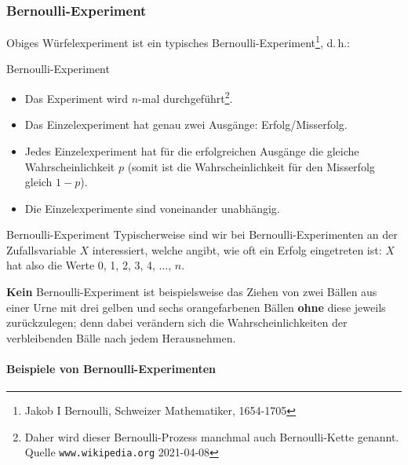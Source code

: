 \subsubsection{Bernoulli-Experiment}
Obiges Würfelexperiment ist ein typisches
Bernoulli-Experiment\footnote{Jakob I Bernoulli, Schweizer Mathematiker,
  1654-1705}, d.\,h.:

\begin{definition}{Bernoulli-Experiment}{}
\begin{itemize}
\item Das Experiment wird $n$-mal durchgeführt\footnote{Daher wird dieser
Bernoulli-Prozess manchmal auch Bernoulli-Kette genannt. Quelle
\texttt{www.wikipedia.org} 2021-04-08}.
\item Das Einzelexperiment hat genau zwei Ausgänge: Erfolg/Misserfolg.
\item Jedes Einzelexperiment hat für die erfolgreichen Ausgänge die gleiche
      Wahrscheinlichkeit $p$ (somit ist die Wahrscheinlichkeit für den
      Misserfolg gleich $1-p$).
\item Die Einzelexperimente sind voneinander unabhängig.
\end{itemize}
\end{definition}

\begin{bemerkung}{Bernoulli-Experiment}{}
Typischerweise sind wir bei Bernoulli-Experimenten an der
Zufallsvariable $X$ interessiert, welche angibt, wie oft ein Erfolg
eingetreten ist: $X$ hat also die Werte 0, 1, 2, 3, 4, ..., $n$.
\end{bemerkung}

\textbf{Kein} Bernoulli-Experiment ist beispielsweise das Ziehen von zwei Bällen aus
einer Urne mit drei gelben und sechs orangefarbenen Bällen \textbf{ohne} diese
jeweils zurückzulegen; denn dabei verändern sich die
Wahrscheinlichkeiten der verbleibenden Bälle nach jedem Herausnehmen.
\newpage


\paragraph{Beispiele von Bernoulli-Experimenten}

